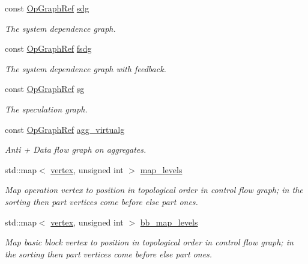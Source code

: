 \begin{DoxyCompactItemize}
const \hyperlink{op__graph_8hpp_aee97c95c40f791b60c451d9e29c72d39}{Op\+Graph\+Ref} \hyperlink{classFunctionBehavior_ac63d33524ffbc4d8eacf94a854785232}{sdg}
\begin{DoxyCompactList}\small\item\em The system dependence graph. \end{DoxyCompactList}\item 
const \hyperlink{op__graph_8hpp_aee97c95c40f791b60c451d9e29c72d39}{Op\+Graph\+Ref} \hyperlink{classFunctionBehavior_afab0ef4738fe6dbfd99dfb12ad648825}{fsdg}
\begin{DoxyCompactList}\small\item\em The system dependence graph with feedback. \end{DoxyCompactList}\item 
const \hyperlink{op__graph_8hpp_aee97c95c40f791b60c451d9e29c72d39}{Op\+Graph\+Ref} \hyperlink{classFunctionBehavior_ada707e113446bf70398f1b3612a012f9}{sg}
\begin{DoxyCompactList}\small\item\em The speculation graph. \end{DoxyCompactList}\item 
const \hyperlink{op__graph_8hpp_aee97c95c40f791b60c451d9e29c72d39}{Op\+Graph\+Ref} \hyperlink{classFunctionBehavior_a3cb9aa960dfcc9f0a7bd367bf391935b}{agg\+\_\+virtualg}
\begin{DoxyCompactList}\small\item\em Anti + Data flow graph on aggregates. \end{DoxyCompactList}\item 
std\+::map$<$ \hyperlink{graph_8hpp_abefdcf0544e601805af44eca032cca14}{vertex}, unsigned int $>$ \hyperlink{classFunctionBehavior_afb880ba64de5761152258b08528d5e1c}{map\+\_\+levels}
\begin{DoxyCompactList}\small\item\em Map operation vertex to position in topological order in control flow graph; in the sorting then part vertices come before else part ones. \end{DoxyCompactList}\item 
std\+::map$<$ \hyperlink{graph_8hpp_abefdcf0544e601805af44eca032cca14}{vertex}, unsigned int $>$ \hyperlink{classFunctionBehavior_aab66e36d4807146da5e9fef87cf1debc}{bb\+\_\+map\+\_\+levels}
\begin{DoxyCompactList}\small\item\em Map basic block vertex to position in topological order in control flow graph; in the sorting then part vertices come before else part ones. \end{DoxyCompactList}\item 

\end{DoxyCompactItemize}
